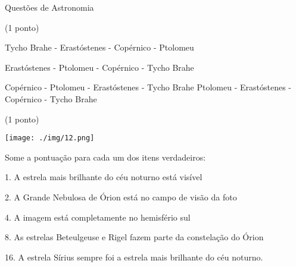 \documentclass{../lista}
\begin{document}
\begin{secao}{Questões de Astronomia}
\begin{questao}{(1 ponto)}
			\begin{alternativas}
				\item Tycho Brahe - Erastóstenes - Copérnico - Ptolomeu
				\item Erastóstenes - Ptolomeu - Copérnico - Tycho Brahe
				\item Copérnico - Ptolomeu - Erastóstenes - Tycho Brahe
				\alternativaMarcada Ptolomeu - Erastóstenes - Copérnico - Tycho Brahe
			\end{alternativas}
		\end{questao}
		\begin{questao}{(1 ponto)}
			\begin{center}
				\texttt{[image: ./img/12.png]}
			\end{center}
			
			Some a pontuação para cada um dos itens verdadeiros:
			
			1. A estrela mais brilhante do céu noturno está visível
			
			2. A Grande Nebulosa de Órion está no campo de visão da foto
			
			4. A imagem está completamente no hemisfério sul
			
			8. As estrelas Beteulgeuse e Rigel fazem parte da constelação do Órion
			
			16. A estrela Sírius sempre foi a estrela mais brilhante do céu noturno.
			
			

\end{questao}
\end{secao}
\end{document}
